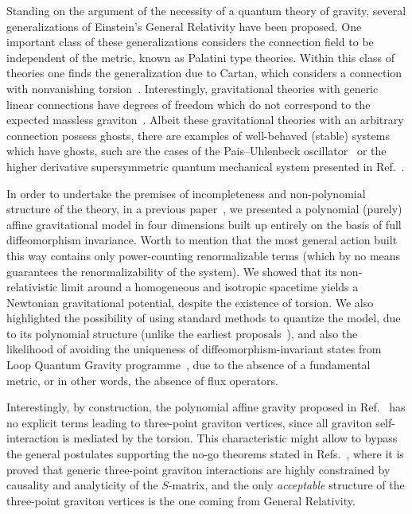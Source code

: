 \documentclass[aps,prd,12pt,twocolumn,superscriptaddress,showpacs,showkeys,reprint,longbibliography]{revtex4-1}
\renewcommand{\(}{\left(}
\renewcommand{\)}{\right)}
\renewcommand{\[}{\left[}
\renewcommand{\]}{\right]}
\begin{document}
Standing on the argument of the necessity of a quantum theory of gravity, several generalizations of Einstein's General Relativity have been proposed. One important class of these generalizations considers the connection field to be independent of the metric, known as Palatini type theories. Within this class of theories one finds the generalization due to Cartan, which considers a connection with nonvanishing torsion~\cite{Cartan1922,Cartan1923,Cartan1924,Cartan1925}. Interestingly, gravitational theories with generic linear connections have degrees of freedom which do not correspond to the expected massless graviton~\cite{Sezgin:1979zf}. Albeit these gravitational theories with an arbitrary connection possess ghosts, there are examples of well-behaved (stable) systems which have ghosts, such are the cases of the Pais--Uhlenbeck oscillator~\cite{Mannheim:2004qz,Bender:2007wu,Smilga:2008pr,Ilhan:2013xe} or the higher derivative supersymmetric quantum mechanical system presented in Ref.~\cite{Robert:2008}. 

In order to undertake the premises of incompleteness and non-polynomial structure of the theory, in a previous paper~\cite{Skirzewski:2014eta}, we presented a polynomial (purely) affine gravitational model in four dimensions built up entirely on the basis of full diffeomorphism invariance. Worth to mention that the most general action built this way contains only power-counting renormalizable terms (which by no means guarantees the renormalizability of the system). We showed that its non-relativistic limit around a homogeneous and isotropic spacetime yields a Newtonian gravitational potential, despite the existence of torsion. We also highlighted the possibility of using standard methods to quantize the model, due to its polynomial structure (unlike the earliest proposals~\cite{Eddington1923math,schrodinger1950space}), and also the likelihood of avoiding the uniqueness of diffeomorphism-invariant states from Loop Quantum Gravity programme~\cite{Lewandowski:2005jk}, due to the absence of a fundamental metric, or in other words, the absence of flux operators.

Interestingly, by construction, the polynomial affine gravity proposed in Ref.~\cite{Skirzewski:2014eta} has no explicit terms leading to three-point graviton vertices, since all graviton self-interaction is mediated by the torsion. This characteristic might allow to bypass the general postulates supporting the no-go theorems stated in Refs.~\cite{McGady:2013sga,Camanho:2014apa}, where it is proved that generic three-point graviton interactions are highly constrained by causality and analyticity of the $S$-matrix, and the only \emph{acceptable} structure of the three-point graviton vertices is the one coming from General Relativity.
\end{document}
